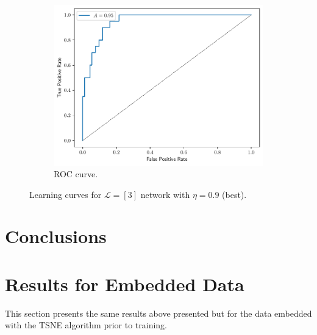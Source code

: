 \documentclass[conference]{IEEEtran}
\theoremstyle{definition}
\theoremstyle{remark}
\theoremstyle{remark}
\begin{document}
\begin{figure}
\begin{subfigure}[b]{0.32\textwidth}
        \includegraphics[width=\textwidth]{figs/3-0.9-roc.pdf}
        \caption{ROC curve.}
    \end{subfigure}
    \caption{Learning curves for $\mathcal{L}=[3]$ network with $\eta=0.9$
    (best).}
    \label{fig:NN-best}
\end{figure}

\section{Conclusions}\label{sec:conc}

\printbibliography

\appendices

\section{Results for Embedded Data}
This section presents the same results above presented but for the data
embedded with the TSNE algorithm prior to training.
\end{document}
